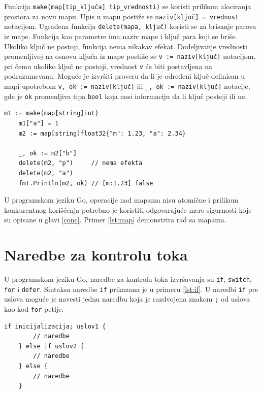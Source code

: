 \documentclass[12pt,oneside]{memoir}
\begin{document}
Funkcija \texttt{make(map[tip\_ključa] tip\_vrednosti)} se koristi prilikom alociranja prostora za novu mapu. Upis u mapu postiže se \texttt{naziv[ključ] = vrednost} notacijom. Ugrađena funkcija \texttt{delete(mapa, ključ)} koristi se za brisanje parova iz mape. Funkcija kao parametre ima naziv mape i ključ para koji se briše. Ukoliko ključ ne postoji, funkcija nema nikakav efekat. Dodeljivanje vrednosti promenljivoj na osnovu ključa iz mape postiže se \texttt{v := naziv[ključ]} notacijom, pri čemu ukoliko ključ ne postoji, vrednost \texttt{v} će biti postavljena na podrazumevanu. Moguće je izvršiti proveru da li je određeni ključ definisan u mapi upotrebom \texttt{v, ok := naziv[ključ]} ili  \texttt{\_, ok := naziv[ključ]} notacije, gde je \texttt{ok} promenljiva tipa \texttt{bool} koja nosi informaciju da li ključ postoji ili ne. 

\begin{center}
\begin{lstlisting}[caption=Rad sa mapama, label={lst:map},  backgroundcolor=\color{background}]
	m1 := make(map[string]int)
	m1["a"] = 1
	m2 := map[string]float32{"m": 1.23, "a": 2.34}
	
	_, ok := m2["b"]
	delete(m2, "p")		// nema efekta
	delete(m2, "a")
	fmt.Println(m2, ok) // [m:1.23] false
\end{lstlisting}
\end{center}

U programskom jeziku Go, operacije nad mapama nisu atomične i prilikom konkurentnog korišćenja potrebno je koristiti odgovarajuće mere sigurnosti koje su opisane u glavi \ref{conc}. Primer \ref{lst:map} demonstrira rad sa mapama.



\section{Naredbe za kontrolu toka}

U programskom jeziku Go, naredbe za kontrolu toka izvršavanja su \texttt{if}, \texttt{switch}, \texttt{for} i \texttt{defer}. Sintaksa naredbe \texttt{if} prikazana je u primeru \ref{lst:if}. U naredbi \texttt{if} pre uslova moguće je navesti jednu naredbu koja je razdvojena znakom \texttt{;} od uslova kao kod \texttt{for} petlje. 

\begin{center}
\begin{lstlisting}[caption=Sintaksa naredbe \texttt{if}, label={lst:if},  backgroundcolor=\color{background}]
	if inicijalizacija; uslov1 {
		// naredbe
	} else if uslov2 {
		// naredbe
	} else {
		// naredbe
	}
\end{lstlisting}
\end{center}
\end{document}
